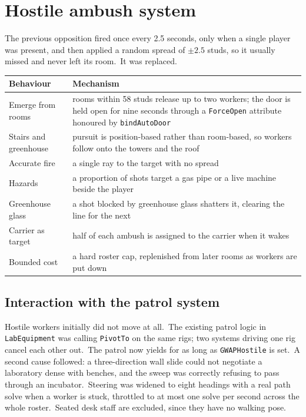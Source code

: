 \section{Hostile ambush system}
The previous opposition fired once every 2.5 seconds, only when a single player
was present, and then applied a random spread of $\pm2.5$ studs, so it usually
missed and never left its room.\ It was replaced.\

\begin{center}
\begin{tabular}{@{}p{}p{}@{}}
\toprule
\textbf{Behaviour} & \textbf{Mechanism} \\
\midrule
Emerge from rooms & rooms within 58 studs release up to two workers; the door is held open for nine seconds through a \texttt{ForceOpen} attribute honoured by \texttt{bindAutoDoor} \\
Stairs and greenhouse & pursuit is position-based rather than room-based, so workers follow onto the towers and the roof \\
Accurate fire & a single ray to the target with no spread \\
Hazards & a proportion of shots target a gas pipe or a live machine beside the player \\
Greenhouse glass & a shot blocked by greenhouse glass shatters it, clearing the line for the next \\
Carrier as target & half of each ambush is assigned to the carrier when it wakes \\
Bounded cost & a hard roster cap, replenished from later rooms as workers are put down \\
\bottomrule
\end{tabular}
\end{center}

\subsection{Interaction with the patrol system}
Hostile workers initially did not move at all.\ The existing patrol logic in
\texttt{LabEquipment} was calling \texttt{PivotTo} on the same rigs; two systems
driving one rig cancel each other out.\ The patrol now yields for as long as
\texttt{GWAPHostile} is set.\ A second cause followed: a three-direction wall
slide could not negotiate a laboratory dense with benches, and the sweep was
correctly refusing to pass through an incubator.\ Steering was widened to eight
headings with a real path solve when a worker is stuck, throttled to at most one
solve per second across the whole roster.\ Seated desk staff are excluded, since
they have no walking pose.\

